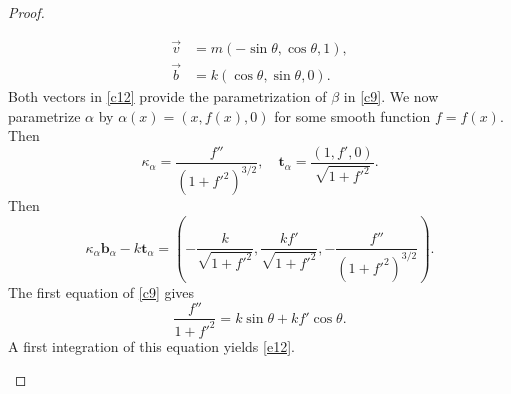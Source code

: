 \documentclass[10pt,a4paper]{amsart}
\def\b{\mathbf b}
\def\t{\mathbf t}
\begin{document}
\begin{proof}
\begin{enumerate}
\begin{enumerate}
\begin{equation*}
\begin{split}
\vec{v}&=m(-\sin\theta,\cos\theta,1),\\
 \vec{b}&=k(\cos\theta,\sin\theta,0).
 \end{split}
 \end{equation*}
Both vectors in \eqref{c12} provide the parametrization of $\beta$  in \eqref{c9}. We now parametrize $\alpha$ by $\alpha(x)=(x,f(x),0)$ for some smooth function $f=f(x)$. Then 
$$\kappa_\alpha=\frac{f''}{(1+f'^2)^{3/2}},\quad \t_\alpha=\frac{(1,f',0)}{\sqrt{1+f'^2}}.$$ 
Then
$$\kappa_\alpha\b_\alpha-k\t_\alpha=\left(-\frac{k}{\sqrt{1+f'^2}},\frac{kf'}{\sqrt{1+f'^2}},-\frac{f''}{(1+f'^2)^{3/2}}\right).$$
The first equation of \eqref{c9} gives 
$$\frac{f''}{1+f'^2}=k\sin\theta+kf'\cos\theta.$$
A first integration of this equation yields \eqref{e12}.   


 
\end{enumerate}


\end{enumerate}
\end{proof}
\end{document}
